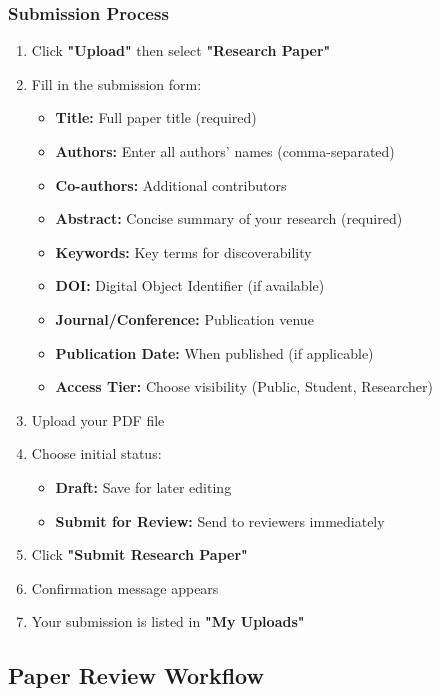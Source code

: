 \documentclass[12pt,a4paper]{article}
\begin{document}
\subsubsection{Submission Process}
\begin{enumerate}[leftmargin=*]
    \item Click \textbf{"Upload"} then select \textbf{"Research Paper"}
    \item Fill in the submission form:
        \begin{itemize}
            \item \textbf{Title:} Full paper title (required)
            \item \textbf{Authors:} Enter all authors' names (comma-separated)
            \item \textbf{Co-authors:} Additional contributors
            \item \textbf{Abstract:} Concise summary of your research (required)
            \item \textbf{Keywords:} Key terms for discoverability
            \item \textbf{DOI:} Digital Object Identifier (if available)
            \item \textbf{Journal/Conference:} Publication venue
            \item \textbf{Publication Date:} When published (if applicable)
            \item \textbf{Access Tier:} Choose visibility (Public, Student, Researcher)
        \end{itemize}
    \item Upload your PDF file
    \item Choose initial status:
        \begin{itemize}
            \item \textbf{Draft:} Save for later editing
            \item \textbf{Submit for Review:} Send to reviewers immediately
        \end{itemize}
    \item Click \textbf{"Submit Research Paper"}
    \item Confirmation message appears
    \item Your submission is listed in \textbf{"My Uploads"}
\end{enumerate}

\subsection{Paper Review Workflow}
\end{document}
